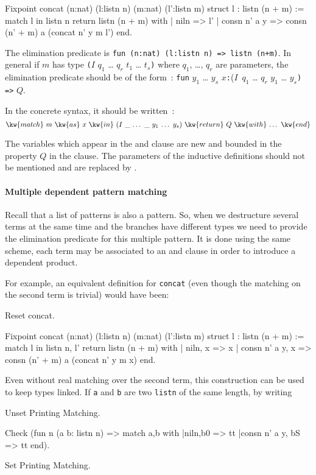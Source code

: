 \begin{coq_example}
Fixpoint concat (n:nat) (l:listn n) (m:nat) (l':listn m) {struct l} :
 listn (n + m) :=
  match l in listn n return listn (n + m) with
  | niln => l'
  | consn n' a y => consn (n' + m) a (concat n' y m l')
  end.
\end{coq_example}
The elimination predicate is {\tt fun (n:nat) (l:listn n) => listn~(n+m)}.
In general if $m$ has type {\tt (}$I$ $q_1$ {\ldots} $q_r$ $t_1$ {\ldots} $t_s${\tt )} where
$q_1$, {\ldots}, $q_r$ are parameters, the elimination predicate should be of
the form~:
{\tt fun} $y_1$ {\ldots} $y_s$ $x${\tt :}($I$~$q_1$ {\ldots} $q_r$ $y_1$ {\ldots}
  $y_s${\tt ) =>} $Q$.

In the concrete syntax, it should be written~:
\[ \kw{match}~m~\kw{as}~x~\kw{in}~(I~\_~\mbox{\ldots}~\_~y_1~\mbox{\ldots}~y_s)~\kw{return}~Q~\kw{with}~\mbox{\ldots}~\kw{end}\]

The variables which appear in the  and  clause are new
and bounded in the property $Q$ in the  clause. The
parameters of the inductive definitions should not be mentioned and
are replaced by \kw{\_}.

\paragraph{Multiple dependent pattern matching}
Recall that a list of patterns is also a pattern. So, when we destructure several
terms at the same time and the branches have different types we need to provide the
elimination predicate for this multiple pattern. It is done using the same
scheme, each term may be associated to an  and  clause in order to
introduce a dependent product.

For example, an equivalent definition for \texttt{concat} (even though the
matching on the second term is trivial) would have been:

\begin{coq_eval}
Reset concat.
\end{coq_eval}
\begin{coq_example}
Fixpoint concat (n:nat) (l:listn n) (m:nat) (l':listn m) {struct l} :
 listn (n + m) :=
  match l in listn n, l' return listn (n + m) with
  | niln, x => x
  | consn n' a y, x => consn (n' + m) a (concat n' y m x)
  end.
\end{coq_example}

Even without real matching over the second term, this construction can be used to
keep types linked.  If {\tt a} and {\tt b} are two {\tt listn} of the same length,
by writing
\begin{coq_eval}
  Unset Printing Matching.
\end{coq_eval}
\begin{coq_example}
Check (fun n (a b: listn n) => match a,b with
 |niln,b0 => tt
 |consn n' a y, bS => tt
end).
\end{coq_example}
\begin{coq_eval}
  Set Printing Matching.
\end{coq_eval}

